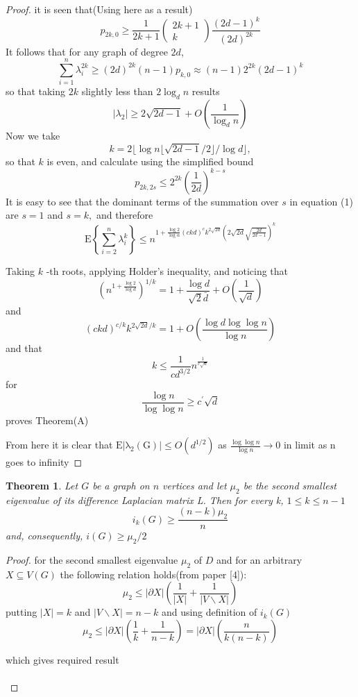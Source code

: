 \documentclass[oneside]{book}
\newtheorem{theorem}{Theorem}[section]
\begin{document}
\begin{proof}
		
		
		
		
		 it is seen that(Using here as a result)  
		$$ p_{2 k, 0} \geq \frac{1}{2 k+1}\left(\begin{array}{c}
		2 k+1 \\
		k
		\end{array}\right) \frac{(2 d-1)^{k}}{(2 d)^{2 k}}$$
		It follows that for any graph of degree $2 d$,
		$$
		\sum_{i=1}^{n} \lambda_{i}^{2 k} \geq(2 d)^{2 k}(n-1) p_{k, 0} \approx(n-1) 2^{2 k}(2 d-1)^{k}
		$$
		so that taking $2 k$ slightly less than $2 \log _{d} n$ results 
		$$
		\left|\lambda_{2}\right| \geq 2 \sqrt{2 d-1}+O\left(\frac{1}{\log _{d} n}\right)
		$$
		Now we take $$k=2\lfloor\log n\lfloor\sqrt{2 d-1} / 2\rfloor / \log d\rfloor,$$ so that $k$ is even, and calculate
		using the simplified bound
		$$
		p_{2 k, 2 s} \leq 2^{2 k}\left(\frac{1}{2 d}\right)^{k-s}
		$$
		It is easy to see that the dominant terms of the summation over $s$ in equation (1) are $s=1$ and $s=k,$ and therefore
		$$
		\mathrm{E}\left\{\sum_{i=2}^{n} \lambda_{i}^{k}\right\} \leq n^{1+\frac{\log 2}{\log \alpha}(c k d)^{c} k^{2 \sqrt{2 d}}(2 \sqrt{2 d} \sqrt{\frac{2 d}{2 d-1}})^{k}}	$$
	
		Taking $k$ -th roots, applying Holder's  inequality, and noticing that
		$$
		\left(n^{1+\frac{\log 2}{\log d}}\right)^{1 / k}=1+\frac{\log d}{\sqrt{2} \bar{d}}+O\left(\frac{1}{\sqrt{d}}\right)
		$$
		and 
		$$
		(c k d)^{c / k} k^{2 \sqrt{2 d} / k}=1+O\left(\frac{\log d \log \log n}{\log n}\right)
		$$
		and that
		$$
		k \leq \frac{1}{c d^{3 / 2}} n^{\frac{1}{c \sqrt{a}}}
		$$
		for
		$$
		\frac{\log n}{\log \log n} \geq c^{\prime} \sqrt{d}
		$$
		proves Theorem(A)  \par 
		From here it is clear that $\mathrm{E|\lambda_{2}(G)|} \leq O(d^{1/2})$ as $\frac{ \log \log n}{\log n}\rightarrow 0$ in limit  as n goes to  infinity 
	\end{proof} 
	\begin{theorem} 
		\label{t:14}
		Let $G$ be a graph on $n$ vertices and let $\mu_{2}$ be the second smallest eigenvalue of its difference Laplacian matrix L. Then for every k, 
		$1 \leq k \leq n-1$
		$$
		i_{k}(G) \geq \frac{(n-k) \mu_{2}}{n}
		$$
		and, consequently, $i(G) \geq \mu_{2} / 2$ \par
	\end{theorem} 
	\begin{proof}
		for the second smallest eigenvalue $\mu_{2}$ of $D$ and for an arbitrary $X \subseteq V(G)$ the following relation holds(from paper [4]):
		$$
		\mu_{2} \leq|\partial X|\left(\frac{1}{|X|}+\frac{1}{|V \backslash X|}\right)
		$$
		putting $|X| = k $ and $|V\backslash X| = n-k $ and using definition of $i_k(G)$ 
		$$ \mu_{2} \leq|\partial X|\left(\frac{1}{k}+\frac{1}{n-k}\right) = |\partial X|\left(\frac{n}{k(n-k)}\right) $$ \par
		which gives required result\\\\
	\end{proof} 
	
\end{document}

